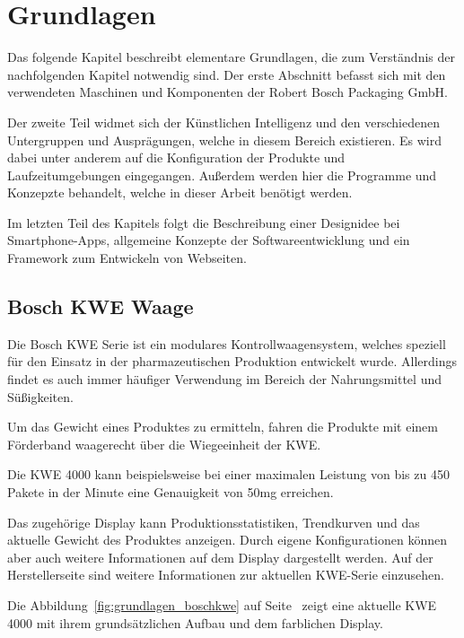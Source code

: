 \chapter{Grundlagen}
\label{ch:grundlagen}
Das folgende Kapitel beschreibt elementare Grundlagen, die zum Verständnis der nachfolgenden Kapitel notwendig sind. Der
erste Abschnitt befasst sich mit den verwendeten Maschinen und Komponenten der Robert Bosch Packaging GmbH.

Der zweite Teil widmet sich der Künstlichen Intelligenz und den verschiedenen Untergruppen und Ausprägungen, welche in
diesem Bereich existieren. Es wird dabei unter anderem auf die Konfiguration der Produkte und Laufzeitumgebungen
eingegangen. Außerdem werden hier die Programme und Konzepzte behandelt, welche in dieser Arbeit benötigt werden.

Im letzten Teil des Kapitels folgt die Beschreibung einer Designidee bei Smartphone-Apps, allgemeine Konzepte der
Softwareentwicklung und ein Framework zum Entwickeln von Webseiten.

\section{Bosch KWE Waage}
Die Bosch KWE Serie ist ein modulares Kontrollwaagensystem, welches speziell für den Einsatz in der pharmazeutischen
Produktion entwickelt wurde. Allerdings findet es auch immer häufiger Verwendung im Bereich der Nahrungsmittel und
Süßigkeiten.

Um das Gewicht eines Produktes zu ermitteln, fahren die Produkte mit einem Förderband waagerecht über die Wiegeeinheit
der KWE.

Die KWE 4000 kann beispielsweise bei einer maximalen Leistung von bis zu 450 Pakete in der Minute eine Genauigkeit von
50mg erreichen.

Das zugehörige Display kann Produktionsstatistiken, Trendkurven und das aktuelle Gewicht des Produktes anzeigen. Durch
eigene Konfigurationen können aber auch weitere Informationen auf dem Display dargestellt werden. Auf der
Herstellerseite\cite{online_grundlagen_boschkwe} sind weitere Informationen zur aktuellen KWE-Serie einzusehen.

Die Abbildung~\ref{fig:grundlagen_boschkwe} auf Seite~\pageref{fig:grundlagen_boschkwe} zeigt eine aktuelle KWE 4000 mit
ihrem grundsätzlichen Aufbau und dem farblichen Display.

